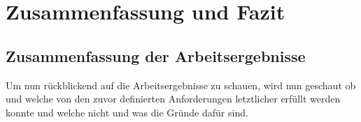 
\chapter{Zusammenfassung und Fazit }
\label{chapter:7}

\section{Zusammenfassung der Arbeitsergebnisse}

Um nun rückblickend auf die Arbeitsergebnisse zu schauen, wird nun geschaut ob und welche von den zuvor definierten Anforderungen letztlicher erfüllt werden konnte und welche nicht und was die Gründe dafür sind.


